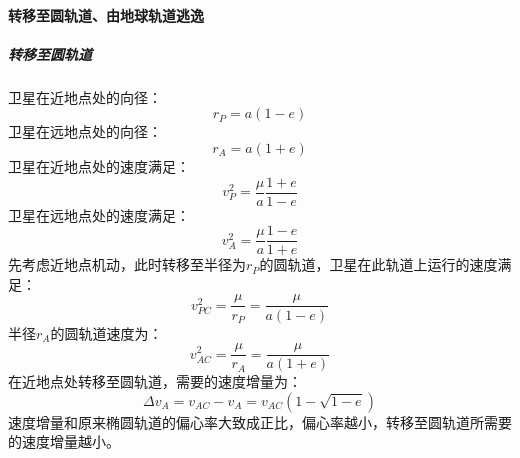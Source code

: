 \paragraph{转移至圆轨道、由地球轨道逃逸}
\subparagraph{转移至圆轨道}
卫星在近地点处的向径：
\begin{equation}
	r_{P}=a(1-e)
\end{equation}
卫星在远地点处的向径：
\begin{equation}
	r_{A}=a(1+e)
\end{equation}
卫星在近地点处的速度满足：
\begin{equation}
	v_{P}^2=\frac{\mu}{a}\frac{1+e}{1-e}
\end{equation}
卫星在远地点处的速度满足：
\begin{equation}
	v_{A}^2=\frac{\mu}{a}\frac{1-e}{1+e}
\end{equation}
先考虑近地点机动，此时转移至半径为$r_{P}$的圆轨道，卫星在此轨道上运行的速度满足：
\begin{equation}
	v_{PC}^2=\frac{\mu}{r_{P}}=\frac{\mu}{a(1-e)}
\end{equation}
半径$r_{A}$的圆轨道速度为：
\begin{equation}
	v_{AC}^2=\frac{\mu}{r_{A}}=\frac{\mu}{a(1+e)}
\end{equation}
在近地点处转移至圆轨道，需要的速度增量为：
\begin{equation}
	\Delta v_{A}=v_{AC}-v_{A}=v_{AC}(1-\sqrt{1-e})
\end{equation}
速度增量和原来椭圆轨道的偏心率大致成正比，偏心率越小，转移至圆轨道所需要的速度增量越小。

